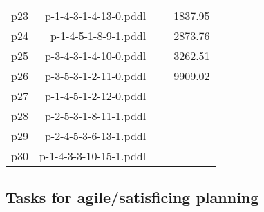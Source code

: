 \documentclass{article}
\begin{document}
\begin{center}
\begin{tabular}{@{}l|r|r|r@{}}
  p23& p-1-4-3-1-4-13-0.pddl&--&1837.95\\
  p24& p-1-4-5-1-8-9-1.pddl&--&2873.76\\
  p25& p-3-4-3-1-4-10-0.pddl&--&3262.51\\
  p26& p-3-5-3-1-2-11-0.pddl&--&9909.02\\
  p27& p-1-4-5-1-2-12-0.pddl&--&--\\
  p28& p-2-5-3-1-8-11-1.pddl&--&--\\
  p29& p-2-4-5-3-6-13-1.pddl&--&--\\
  p30& p-1-4-3-3-10-15-1.pddl&--&--
                            \end{tabular}
                            \end{center}
                    

                    \subsection*{Tasks for agile/satisficing planning}
                    
\end{document}
